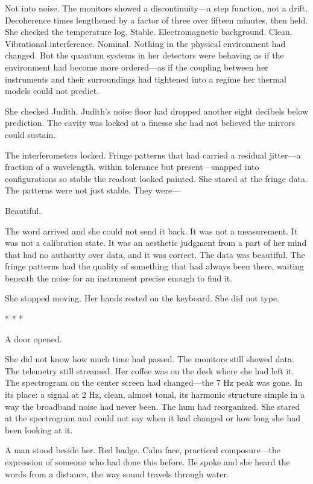 \documentclass[12pt]{article}
\newcommand{\scenebreak}{\begin{center}* * *\end{center}}
\begin{document}
Not into noise. The monitors showed a discontinuity---a step function, not a drift. Decoherence times lengthened by a factor of three over fifteen minutes, then held. She checked the temperature log. Stable. Electromagnetic background. Clean. Vibrational interference. Nominal. Nothing in the physical environment had changed. But the quantum systems in her detectors were behaving as if the environment had become more ordered---as if the coupling between her instruments and their surroundings had tightened into a regime her thermal models could not predict.

She checked Judith. Judith's noise floor had dropped another eight decibels below prediction. The cavity was locked at a finesse she had not believed the mirrors could sustain.

The interferometers locked. Fringe patterns that had carried a residual jitter---a fraction of a wavelength, within tolerance but present---snapped into configurations so stable the readout looked painted. She stared at the fringe data. The patterns were not just stable. They were---

Beautiful.

The word arrived and she could not send it back. It was not a measurement. It was not a calibration state. It was an aesthetic judgment from a part of her mind that had no authority over data, and it was correct. The data was beautiful. The fringe patterns had the quality of something that had always been there, waiting beneath the noise for an instrument precise enough to find it.

She stopped moving. Her hands rested on the keyboard. She did not type.

\scenebreak

A door opened.

She did not know how much time had passed. The monitors still showed data. The telemetry still streamed. Her coffee was on the desk where she had left it. The spectrogram on the center screen had changed---the 7 Hz peak was gone. In its place: a signal at 2 Hz, clean, almost tonal, its harmonic structure simple in a way the broadband noise had never been. The hum had reorganized. She stared at the spectrogram and could not say when it had changed or how long she had been looking at it.

A man stood beside her. Red badge. Calm face, practiced composure---the expression of someone who had done this before. He spoke and she heard the words from a distance, the way sound travels through water.
\end{document}
